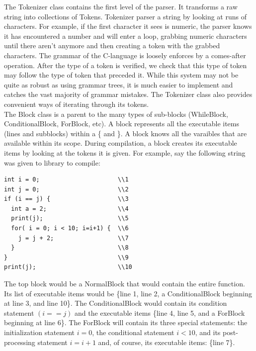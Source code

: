 \documentclass{article}
\begin{document}
\noindent
The Tokenizer class contains the first level of the parser. It transforms
a raw string into collections of Tokens. Tokenizer parser a string by looking
at runs of characters. For example, if the first character it sees is numeric,
the parser knows it has encountered a number and will enter a loop, grabbing
numeric characters until there aren't anymore and then creating a token with
the grabbed characters. The grammar of the C-language is loosely enforces by
a comes-after operation. After the type of a token is verified, we check that
this type of token may follow the type of token that preceded it. While this
system may not be quite as robust as using grammar trees, it is much easier
to implement and catches the vast majority of grammar mistakes. The Tokenizer
class also provides convenient ways of iterating through its tokens. \\

\noindent
The Block class is a parent to the many types of sub-blocks (WhileBlock,
ConditionalBlock, ForBlock, etc). A block represents all the executable
items (lines and subblocks) within a \{ and \}. A block knows all the 
varaibles that are available within its scope. During compilation, a block
creates its executable items by looking at the tokens it is given. For 
example, say the following string was given to library to compile:
{\ttfamily \begin{verbatim}
int i = 0;                      \\1 
int j = 0;                      \\2 
if (i == j) {                   \\3
  int a = 2;                    \\4
  print(j);                     \\5
  for( i = 0; i < 10; i=i+1) {  \\6
    j = j + 2;                  \\7
  }                             \\8
}                               \\9
print(j);                       \\10
\end{verbatim} }
\noindent
The top block would be a NormalBlock that would contain the entire function.
Its list of executable items would be \{line 1, line 2, a ConditionalBlock 
beginning at line 3, and line 10\}. The ConditionalBlock would contain its
condition statement $(i == j)$ and the executable items \{line 4, line 5,
and a ForBlock beginning at line 6\}. The ForBlock will contain its three
special statements: the initialization statement $i = 0$, the conditional
statement $i < 10$, and its post-processing statement $i=i+1$ and, of course,
its executable items: \{line 7\}. \\
\end{document}
